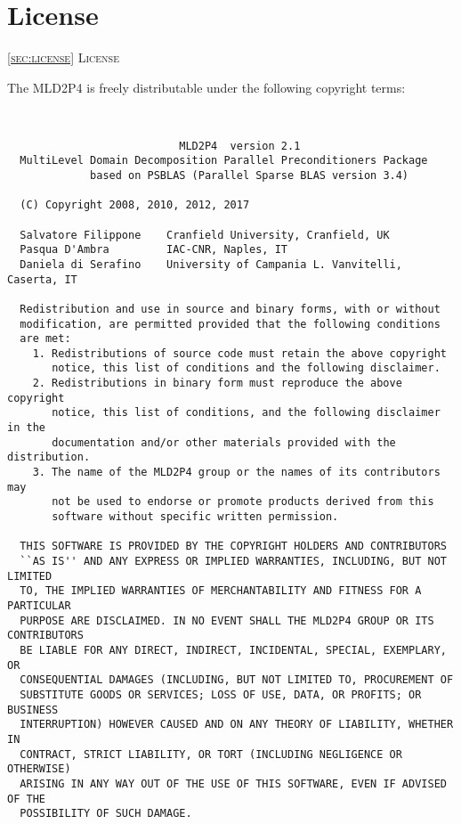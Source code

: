 \section{License\label{sec:license}}
         {\textsc{\ref{sec:license} License}}

The MLD2P4 is freely distributable under the following copyright
terms: {\small
\begin{verbatim} 

 
                           MLD2P4  version 2.1
  MultiLevel Domain Decomposition Parallel Preconditioners Package
             based on PSBLAS (Parallel Sparse BLAS version 3.4)
  
  (C) Copyright 2008, 2010, 2012, 2017

  Salvatore Filippone    Cranfield University, Cranfield, UK
  Pasqua D'Ambra         IAC-CNR, Naples, IT
  Daniela di Serafino    University of Campania L. Vanvitelli, Caserta, IT

  Redistribution and use in source and binary forms, with or without
  modification, are permitted provided that the following conditions
  are met:
    1. Redistributions of source code must retain the above copyright
       notice, this list of conditions and the following disclaimer.
    2. Redistributions in binary form must reproduce the above copyright
       notice, this list of conditions, and the following disclaimer in the
       documentation and/or other materials provided with the distribution.
    3. The name of the MLD2P4 group or the names of its contributors may
       not be used to endorse or promote products derived from this
       software without specific written permission.
 
  THIS SOFTWARE IS PROVIDED BY THE COPYRIGHT HOLDERS AND CONTRIBUTORS
  ``AS IS'' AND ANY EXPRESS OR IMPLIED WARRANTIES, INCLUDING, BUT NOT LIMITED
  TO, THE IMPLIED WARRANTIES OF MERCHANTABILITY AND FITNESS FOR A PARTICULAR
  PURPOSE ARE DISCLAIMED. IN NO EVENT SHALL THE MLD2P4 GROUP OR ITS CONTRIBUTORS
  BE LIABLE FOR ANY DIRECT, INDIRECT, INCIDENTAL, SPECIAL, EXEMPLARY, OR
  CONSEQUENTIAL DAMAGES (INCLUDING, BUT NOT LIMITED TO, PROCUREMENT OF
  SUBSTITUTE GOODS OR SERVICES; LOSS OF USE, DATA, OR PROFITS; OR BUSINESS
  INTERRUPTION) HOWEVER CAUSED AND ON ANY THEORY OF LIABILITY, WHETHER IN
  CONTRACT, STRICT LIABILITY, OR TORT (INCLUDING NEGLIGENCE OR OTHERWISE)
  ARISING IN ANY WAY OUT OF THE USE OF THIS SOFTWARE, EVEN IF ADVISED OF THE
  POSSIBILITY OF SUCH DAMAGE.
 
\end{verbatim}
}
